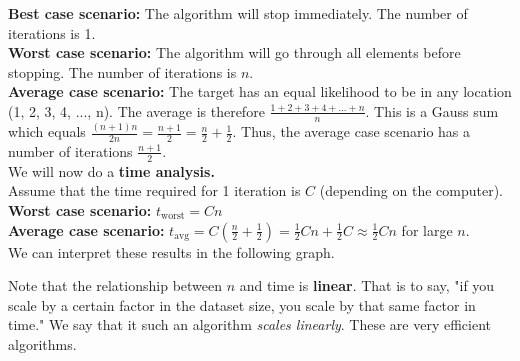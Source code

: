 \documentclass[]{article}
\begin{document}
\textbf{Best case scenario:} The algorithm will stop immediately. The number of iterations is 1.\\

\textbf{Worst case scenario:} The algorithm will go through all elements before stopping. The number of iterations is $n$.\\

\textbf{Average case scenario:} The target has an equal likelihood to be in any location (1, 2, 3, 4, ..., n). The average is therefore $\frac{1+2+3+4+...+n}{n}$. This is a Gauss sum which equals $\frac{(n+1)n}{2n} = \frac{n+1}{2} = \frac{n}{2} + \frac{1}{2}$. Thus, the average case scenario has a number of iterations $\frac{n+1}{2}$.\\


We will now do a \textbf{time analysis.}\\

Assume that the time required for 1 iteration is $C$ (depending on the computer).\\

\textbf{Worst case scenario:} $t_{\mathrm{worst}} = C n$\\

\textbf{Average case scenario:} $t_{\mathrm{avg}} = C (\frac{n}{2} + \frac{1}{2}) = \frac{1}{2}Cn + \frac{1}{2}C 
\approx \frac{1}{2}Cn$ for large $n$.\\


We can interpret these results in the following graph.\bigbreak

\begin{center}
\end{center}

Note that the relationship between $n$ and time is \textbf{linear}. That is to say, "if you scale by a certain factor in the dataset size, you scale by that same factor in time." We say that it such an algorithm \textit{scales linearly}. These are very efficient algorithms.\\
\end{document}
